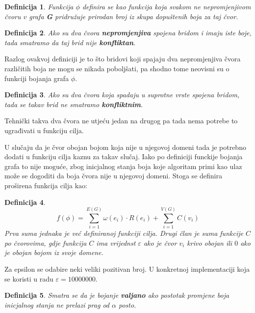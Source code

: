 \documentclass[times, utf8, diplomski, numeric]{fer}
\newtheorem{definition}{Definicija}
\begin{document}
\begin{definition}
Funkcija $\phi$ definira se kao funkcija koja svakom ne nepromjenjivom čvoru $v$ grafa \textbf{G} pridružuje prirodan broj iz skupa dopuštenih boja za taj čvor.
\end{definition}

\begin{definition}
Ako su dva čvora \textbf{nepromjenjiva} spojena bridom i imaju iste boje, tada smatramo da taj brid nije \textbf{konfliktan}.
\end{definition}

Razlog ovakvoj definiciji je to što bridovi koji spajaju dva nepromjenjiva čvora različitih boja ne mogu se nikada poboljšati, pa shodno tome neovisni su o funkciji bojanja grafa $\phi$.

\begin{definition}
Ako su dva čvora koja spadaju u suprotne vrste spojena bridom, tada se takav brid ne smatramo \textbf{konfliktnim}.
\end{definition}

Tehnički takva dva čvora ne utjeću jedan na drugog pa tada nema potrebe to ugrađivati u funkciju cilja.

U slučaju da je čvor obojan bojom koja nije u njegovoj domeni tada je potrebno dodati u funkciju cilja kaznu za takav slučaj. Iako po definiciji funckije bojanja grafa to nije moguće, zbog inicjalnog stanja boja koje algoritam primi kao ulaz može se dogoditi da boja čvora nije u njegovoj domeni. Stoga se definira proširena funkcija cilja kao:

\begin{definition}
\begin{equation}
\label{equ:funkcija_cilja}
f(\phi) = \sum_{i=1}^{E(G)} \omega(e_i) \cdot R(e_i) + \sum_{i=1}^{V(G)} C(v_i)
\end{equation}
Prva suma jednaka je već definiranoj funkciji cilja. Drugi član je suma funkcije $C$ po čvorovima, gdje funkcija $C$ ima vrijednst $\varepsilon$ ako je čvor $v_i$ krivo obojan ili $0$ ako je obojan bojom iz svoje domene.
\end{definition}

Za epsilon se odabire neki veliki pozitivan broj. U konkretnoj implementaciji koja se koristi u radu $\varepsilon=10000000$.

\begin{definition}
Smatra se da je bojanje \textbf{valjano} ako postotak promjene boja inicjalnog stanja ne prelazi prag od $\alpha$ posto.
\end{definition}
\end{document}
